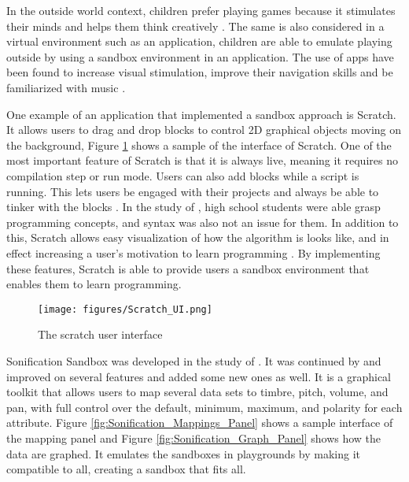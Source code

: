 In the outside world context, children prefer playing games because it stimulates their minds and helps them think creatively \cite{martin1999social, inal2007flow}. The same is also considered in a virtual environment such as an application, children are able to emulate playing outside by using a sandbox environment in an application. The use of apps have been found to increase visual stimulation, improve their navigation skills and be familiarized with music \cite{burton2016music}.

One example of an application that implemented a sandbox approach is Scratch. It allows users to drag and drop blocks to control 2D graphical objects moving on the background, Figure \ref{fig:Scratch_User_Interface} shows a sample of the interface of Scratch. One of the most important feature of Scratch is that it is always live, meaning it requires no compilation step or run mode. Users can also add blocks while a script is running. This lets users be engaged with their projects and always be able to tinker with the blocks \cite{maloney2010scratch}. In the study of , high school students were able grasp programming concepts, and syntax was also not an issue for them. In addition to this, Scratch allows easy visualization of how the algorithm is looks like, and in effect increasing a user’s motivation to learn programming \cite{erol2017effects}. By implementing these features, Scratch is able to provide users a sandbox environment that enables them to learn programming. 

\newpage

\begin{figure}[H]
    \centering
    \texttt{[image: figures/Scratch\_UI.png]}
    \caption{The scratch user interface \protect\cite{maloney2010scratch}}
    \label{fig:Scratch_User_Interface}
\end{figure}

Sonification Sandbox was developed in the study of . It was continued by  and improved on several features and added some new ones as well. It is a graphical toolkit that allows users to map several data sets to timbre, pitch, volume, and pan, with full control over the default, minimum, maximum, and polarity for each attribute. Figure \ref{fig:Sonification_Mappings_Panel} shows a sample interface of the mapping panel and Figure \ref{fig:Sonification_Graph_Panel} shows how the data are graphed. It emulates the sandboxes in playgrounds by making it compatible to all, creating a sandbox that fits all. 

